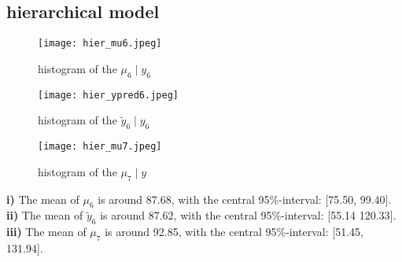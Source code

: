 \documentclass[article,11pt]{article}
\begin{document}
\subsection{hierarchical model}
\begin{figure}[H]
	\centering
	\captionsetup{justification=centering}
	\texttt{[image: hier\_mu6.jpeg]}
	\caption{histogram of the $\mu_{6}\mid y_{6}$}
\end{figure}
\begin{figure}[H]
	\centering
	\captionsetup{justification=centering}
	\texttt{[image: hier\_ypred6.jpeg]}
	\caption{histogram of the $\tilde{y}_{6}\mid y_{6}$}
\end{figure}
\begin{figure}[H]
	\centering
	\captionsetup{justification=centering}
	\texttt{[image: hier\_mu7.jpeg]}
	\caption{histogram of the $\mu_{7}\mid y$}
\end{figure}
\textbf{i)} The mean of $\mu_{6}$ is around 87.68, with the central 95\%-interval: [75.50, 99.40].\\
\textbf{ii)} The mean of $\tilde{y}_{6}$ is around 87.62, with the central 95\%-interval: [55.14 120.33].\\
\textbf{iii)} The mean of $\mu_{7}$ is around 92.85, with the central 95\%-interval: [51.45, 131.94].\\

 


\end{document}
